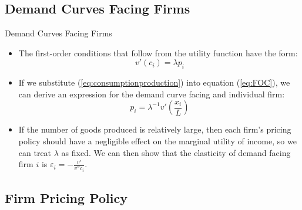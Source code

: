 \documentclass[aspectratio=169]{beamer}
\begin{document}

\subsection{Demand Curves Facing Firms}


\begin{frame}{Demand Curves Facing Firms}

\begin{itemize}
    \item<1-> The first-order conditions that follow from the utility function have the form:
    \begin{equation}
        v'\left( c_{i} \right) = \lambda p_{i}
        \label{eq:FOC}
    \end{equation}
    \item<2-> If we substitute (\ref{eq:consumptionproduction}) into equation (\ref{eq:FOC}), we can derive an expression for the demand curve facing and individual firm:
    \begin{equation*}
        p_{i} = \lambda^{-1} v'\left( \frac{x_{i}}{L} \right)
    \end{equation*}
    \item<3-> If the number of goods produced is relatively large, then each firm’s pricing policy should have a negligible effect on the marginal utility of income, so we can treat $ \lambda $ as fixed.  We can then show that the elasticity of demand facing firm $ i $ is $ \varepsilon_{i} = -\frac{v'}{v'' c_{i}} $.
\end{itemize}
    
\end{frame}


\subsection{Firm Pricing Policy}

\end{document}
